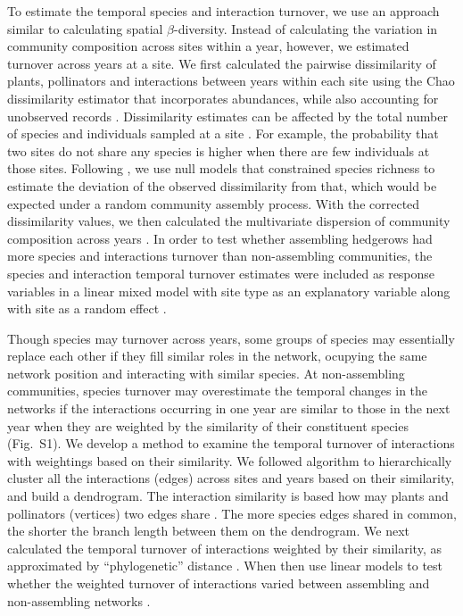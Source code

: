 \documentclass[12pt]{article}
\begin{document}
To estimate the temporal species and interaction turnover, we use an
approach similar to calculating spatial $\beta$-diversity. Instead of
calculating the variation in community composition across sites within
a year, however, we estimated turnover across years at a site. We
first calculated the pairwise dissimilarity of plants, pollinators and
interactions between years within each site using the Chao
dissimilarity estimator that incorporates abundances, while also
accounting for unobserved records \citep{chao-2005-148}. Dissimilarity
estimates can be affected by the total number of species and
individuals sampled at a site \citep[e.g.,][]{ponisio2015farm}. For
example, the probability that two sites do not share any species is
higher when there are few individuals at those sites. Following
\cite{ponisio2015farm}, we use null models that constrained species
richness to estimate the deviation of the observed dissimilarity from
that, which would be expected under a random community assembly
process. With the corrected dissimilarity values, we then calculated
the multivariate dispersion of community composition across years
\citep{anderson-2011-19}. In order to test whether assembling
hedgerows had more species and interactions turnover than
non-assembling communities, the species and interaction temporal
turnover estimates were included as response variables in a linear
mixed model with site type as an explanatory variable along with site
as a random effect \citep{lme4, lmetest}.

Though species may turnover across years, some groups of species may
essentially replace each other if they fill similar roles in the
network, ocupying the same network position and interacting with
similar species. At non-assembling communities, species turnover may
overestimate the temporal changes in the networks if the interactions
occurring in one year are similar to those in the next year when they
are weighted by the similarity of their constituent species
(Fig.~S1). We develop a method to examine the temporal turnover of
interactions with weightings based on their similarity. We followed
\cite{ahn2010link} algorithm to hierarchically cluster all the
interactions (edges) across sites and years based on their similarity,
and build a dendrogram. The interaction similarity is based how may
plants and pollinators (vertices) two edges share \citep{ahn2010link,
  kalinka2011linkcomm}. The more species edges shared in common, the
shorter the branch length between them on the dendrogram.  We next
calculated the temporal turnover of interactions weighted by their
similarity, as approximated by ``phylogenetic'' distance
\citep{graham2008phylogenetic, picante-2010-1463}. When then use
linear models to test whether the weighted turnover of interactions
varied between assembling and non-assembling networks \citep{lme4,
  lmetest}.
\end{document}
